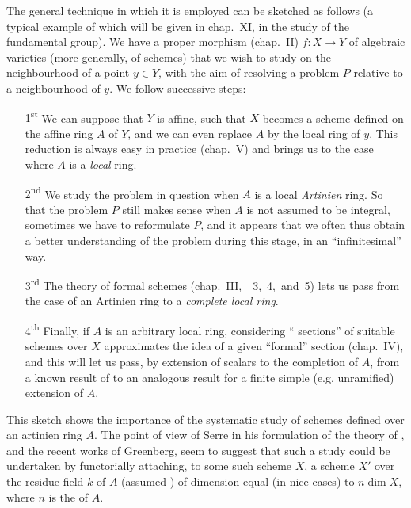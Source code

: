 The general technique in which it is employed can be sketched as follows (a
typical example of which will be given in chap.~XI, in the study of the
fundamental group). We have a proper morphism (chap.~II) $f\colon X\to Y$ of
algebraic varieties (more generally, of schemes) that we wish to study on the
neighbourhood of a point $y\in Y$, with the aim of resolving a problem $P$
relative to a neighbourhood of $y$. We follow successive steps:
\begin{itemize}
  \item[1\textsuperscript{st}]
                 We can suppose that $Y$ is affine, such that $X$ becomes a scheme
                 defined on the affine ring $A$ of $Y$, and we can even replace $A$
                 by the local ring of $y$. This reduction is always easy in practice
                 (chap.~V) and brings us to the case where $A$ is a \emph{local} ring.
  \item[2\textsuperscript{nd}]
                 We study the problem in question when $A$ is a local \emph{Artinien}
                 ring. So that the problem $P$ still makes sense when $A$ is not
                 assumed to be integral, sometimes we have to reformulate $P$, and it
                 appears that we often thus obtain a better understanding of the problem
                 during this stage, in an ``infinitesimal'' way.
  \item[3\textsuperscript{rd}]
                 The theory of formal schemes (chap.~III,~\textsection\textsection~3,~4,~and~5)
                 lets us pass from the case of an Artinien ring to a \emph{complete local ring}.
  \item[4\textsuperscript{th}]
                 Finally, if $A$ is an arbitrary local ring, considering
                 `` sections'' of suitable schemes over $X$
                 approximates the idea of a given ``formal'' section (chap.~IV), and
                 this will let us pass, by extension of scalars to the
                 completion of $A$, from a known result of \completelyunsure to an
                 analogous result for a finite simple (e.g. unramified) extension of $A$.
\end{itemize}

This sketch shows the importance of the systematic study of schemes defined over
an artinien ring $A$. The point of view of Serre in his formulation of the
theory of , and the recent works of Greenberg, seem
to suggest that such a study could be undertaken by functorially attaching, to
some such scheme $X$, a scheme $X'$ over the residue field $k$ of $A$ (assumed
) of dimension equal (in nice cases) to $n\dim X$, where $n$ is
the  of $A$.

